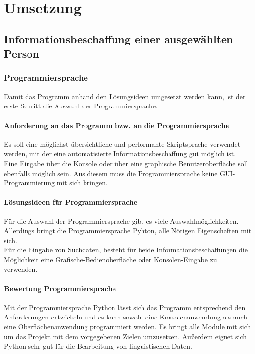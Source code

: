 
\chapter{Umsetzung}  %
\label{cha:} %
\section{Informationsbeschaffung einer ausgewählten Person}
	\subsection{Programmiersprache}
	Damit das Programm anhand den Lösungsideen umgesetzt werden kann, ist der erste Schritt die Auswahl der Programmiersprache.
		
		\subsubsection{Anforderung an das Programm bzw. an die Programmiersprache}
		Es soll eine möglichst übersichtliche und performante Skriptsprache verwendet werden, mit der eine automatisierte Informationsbeschaffung gut möglich ist. Eine Eingabe über die Konsole oder über eine graphische Benutzeroberfläche soll ebenfalls möglich sein. Aus diesem muss die Programmiersprache keine GUI-Programmierung mit sich bringen.
		
		\subsubsection{ Lösungsideen für Programmiersprache}
		Für die Auswahl der Programmiersprache gibt es viele Auswahlmöglichkeiten. Allerdings bringt die Programmiersprache Pyhton, alle Nötigen Eigenschaften mit sich.\\
		Für die Eingabe von Suchdaten, besteht für beide Informationsbeschaffungen die Möglichkeit eine Grafische-Bedienoberfläche oder Konsolen-Eingabe zu verwenden.
		
		\subsubsection{Bewertung Programmiersprache}
		Mit der Programmiersprache Python lässt sich das Programm entsprechend den Anforderungen entwickeln und es kann sowohl eine Konsolenanwendung als auch eine Oberflächenanwendung programmiert werden. Es bringt alle Module mit sich um das Projekt mit dem vorgegebenen Zielen umzusetzen. Außerdem eignet sich Python sehr gut für die Bearbeitung von linguistischen Daten. \cite{bird2009natural}
		
